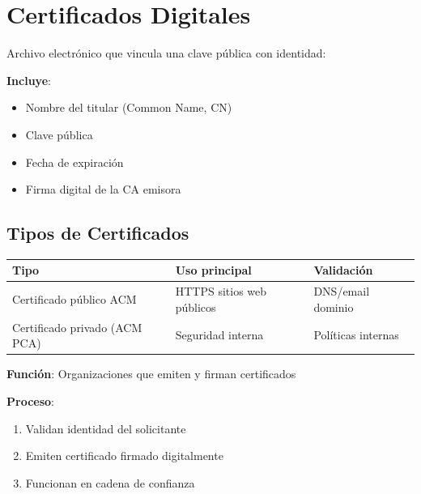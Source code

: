 \documentclass[12pt,a4paper]{report}
\begin{document}
\section{Certificados Digitales}

\begin{conceptbox}
Archivo electrónico que vincula una clave pública con identidad:

\textbf{Incluye}:
\begin{itemize}
    \item Nombre del titular (Common Name, CN)
    \item Clave pública
    \item Fecha de expiración  
    \item Firma digital de la CA emisora
\end{itemize}
\end{conceptbox}

\subsection{Tipos de Certificados}

\begin{center}
\begin{longtable}{|p{4cm}|p{4cm}|p{4cm}|}
\hline
\cellcolor{awsblue!20}\textbf{Tipo} & \cellcolor{awsblue!20}\textbf{Uso principal} & \cellcolor{awsblue!20}\textbf{Validación} \\
\hline
\cellcolor{successgreen!20}Certificado público ACM & HTTPS sitios web públicos & DNS/email dominio \\
\hline
Certificado privado (ACM PCA) & Seguridad interna & Políticas internas \\
\hline
\end{longtable}
\end{center}

\begin{awsbox}
\textbf{Función}: Organizaciones que emiten y firman certificados

\textbf{Proceso}:
\begin{enumerate}
    \item Validan identidad del solicitante
    \item Emiten certificado firmado digitalmente
    \item Funcionan en cadena de confianza
\end{enumerate}
\end{awsbox}
\end{document}
